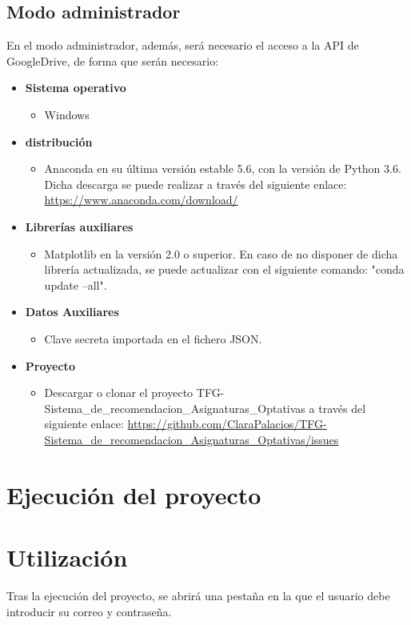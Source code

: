 \subsection{Modo administrador}
En el modo administrador, además, será necesario el acceso a la API de GoogleDrive, de forma que serán necesario: 
\begin{itemize}
\item \textbf{Sistema operativo}
\begin{itemize}
\item Windows
\end{itemize} 
\item \textbf{distribución}
\begin{itemize}
\item Anaconda en su última versión estable 5.6, con la versión de Python 3.6. Dicha descarga se puede realizar a través del siguiente enlace: \url{https://www.anaconda.com/download/}
\end{itemize}
\item \textbf{Librerías auxiliares}
\begin{itemize}
\item Matplotlib en la versión 2.0 o superior.  En caso de no disponer de dicha librería actualizada, se puede actualizar con el siguiente comando: "conda update --all".
\end{itemize}
\item \textbf{Datos Auxiliares}
\begin{itemize}
\item Clave secreta importada en el fichero JSON. 
\end{itemize}
\item \textbf{Proyecto}
\begin{itemize}
\item Descargar o clonar el proyecto TFG-Sistema\_de\_recomendacion\_Asignaturas\_Optativas a través del siguiente enlace: \url{https://github.com/ClaraPalacios/TFG-Sistema_de_recomendacion_Asignaturas_Optativas/issues}
\end{itemize}
\end{itemize}

\section{Ejecución del proyecto}


\section{Utilización}
Tras la ejecución del proyecto, se abrirá una pestaña en la que el usuario debe introducir su correo y contraseña. 
